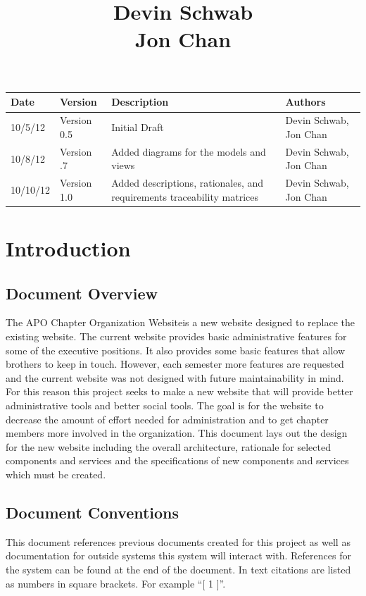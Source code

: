 \documentclass{article}
\title{\projName \\ \vspace{10 mm}
\docName \\ \vspace{10 mm}
Devin Schwab\\
Jon Chan}
\date{\docDate}
\newcommand{\projName}{APO Chapter Organization Website}
\begin{document}


\maketitle

\newpage

\begin{longtable}{|p{}|p{}|p{}|p{}|}
\hline
{\bf Date} & {\bf Version} & {\bf Description} & {\bf Authors} \\ \hline
10/5/12 & Version 0.5 & Initial Draft & Devin Schwab, Jon Chan \\ \hline
10/8/12 & Version .7 & Added diagrams for the models and views & Devin Schwab, Jon Chan \\ \hline
10/10/12 & Version 1.0 & Added descriptions, rationales, and requirements traceability matrices & Devin Schwab, Jon Chan \\ \hline
\end{longtable}

\newpage

\tableofcontents
\listoffigures

\newpage

\section{Introduction}

\subsection{Document Overview}
The \projName is a new website designed to replace the existing website.
The current website provides basic administrative features for some of the executive positions.
It also provides some basic features that allow brothers to keep in touch. However, each semester
more features are requested and the current website was not designed with future maintainability
in mind. For this reason this project seeks to make a new website that will provide better
administrative tools and better social tools. The goal is for the website to decrease the amount of effort
needed for administration and to get chapter members more involved in the organization. This document lays out
the design for the new website including the overall architecture, rationale for selected components and
services and the specifications of new components and services which must be created.

\subsection{Document Conventions}
This document references previous documents created for this project as well as documentation
for outside systems this system will interact with. References for the system can be found at the end of the document.
In text citations are listed as numbers in square brackets. For example ``[ 1 ]''. 
\end{document}
